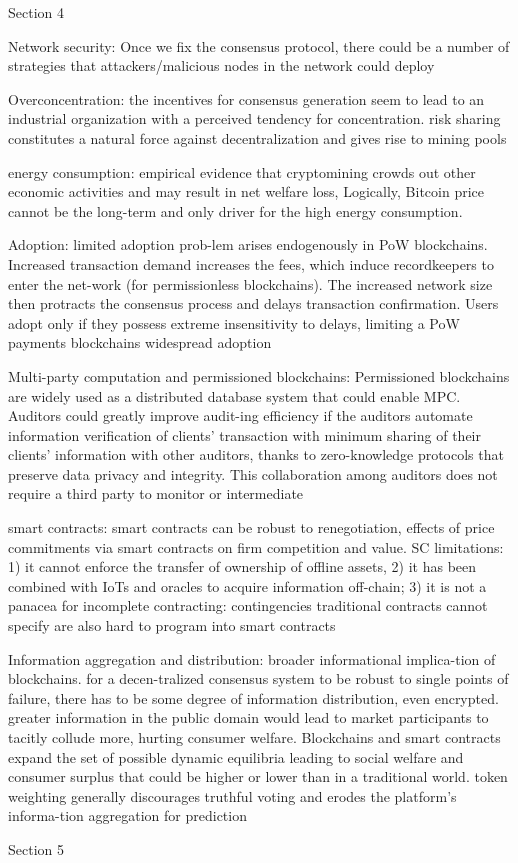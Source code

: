 Section 4

        Network security: Once we fix the consensus protocol, there could be a number of strategies that attackers/malicious nodes in the network could deploy

        Overconcentration: the incentives for consensus generation seem to lead to an industrial organization with a perceived tendency for concentration. risk sharing constitutes a natural force against decentralization and gives rise to mining pools

        energy consumption: empirical evidence that cryptomining crowds out other economic activities and may result in net welfare loss, Logically, Bitcoin price cannot be the long-term and only driver for the high energy consumption.

        Adoption: limited adoption prob-lem arises endogenously in PoW blockchains. Increased transaction demand increases the fees, which induce recordkeepers to enter the net-work (for permissionless blockchains). The increased network size then protracts the consensus process and delays transaction confirmation. Users adopt only if they possess extreme insensitivity to delays, limiting a PoW payments blockchains widespread adoption

        Multi-party computation and permissioned blockchains: Permissioned blockchains are widely used as a distributed database system that could enable MPC. Auditors could greatly improve audit-ing efficiency if the auditors automate information verification of clients' transaction with minimum sharing of their clients' information with other auditors, thanks to zero-knowledge protocols that preserve data privacy and integrity. This collaboration among auditors does not require a third party to monitor or intermediate

        smart contracts: smart contracts can be robust to renegotiation, effects of price commitments via smart contracts on firm competition and value. SC limitations: 1) it cannot enforce the transfer of ownership of offline assets, 2) it has been combined with IoTs and oracles to acquire information off-chain; 3) it is not a panacea for incomplete contracting: contingencies traditional contracts cannot specify are also hard to program into smart contracts

        Information aggregation and distribution: broader informational implica-tion of blockchains. for a decen-tralized consensus system to be robust to single points of failure, there has to be some degree of information distribution, even encrypted. greater information in the public domain would lead to market participants to tacitly collude more, hurting consumer welfare. Blockchains and smart contracts expand the set of possible dynamic equilibria leading to social welfare and consumer surplus that could be higher or lower than in a traditional world. token weighting generally discourages truthful voting and erodes the platform's informa-tion aggregation for prediction

Section 5
